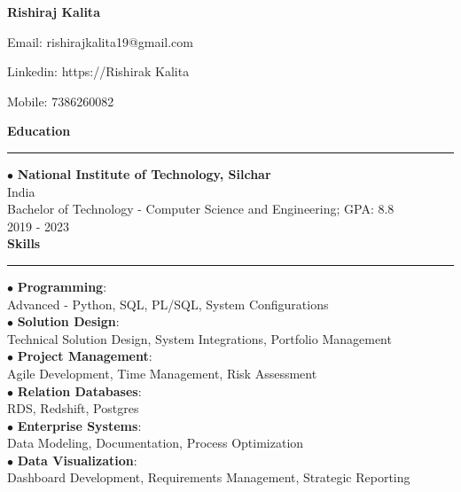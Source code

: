 \documentclass[11pt,a4paper]{article}
\renewcommand{\section}[1]{%
  \vspace{12pt}%
  {\large\bfseries #1}%
  \vspace{6pt}%
  \hrule%
  \vspace{6pt}%
}
\begin{document}
\begin{center}\Huge\textbf{Rishiraj Kalita}\\[0.5cm]\end{center}

\begin{center}Email: rishirajkalita19@gmail.com\end{center}
\begin{center}Linkedin: https://Rishirak Kalita\end{center}
\begin{center}Mobile: 7386260082\end{center}
\section{Education}

\noindent $\bullet$ \textbf{National Institute of Technology, Silchar}\\[0.2cm]
India\\[0.2cm]
Bachelor of Technology - Computer Science and Engineering; GPA: 8.8\\[0.2cm]
2019 - 2023\\[0.2cm]
\section{Skills}

\noindent $\bullet$ \textbf{Programming}:\\[0.2cm]
Advanced - Python, SQL, PL/SQL, System Configurations\\[0.2cm]
\noindent $\bullet$ \textbf{Solution Design}:\\[0.2cm]
Technical Solution Design, System Integrations, Portfolio Management\\[0.2cm]
\noindent $\bullet$ \textbf{Project Management}:\\[0.2cm]
Agile Development, Time Management, Risk Assessment\\[0.2cm]
\noindent $\bullet$ \textbf{Relation Databases}:\\[0.2cm]
RDS, Redshift, Postgres\\[0.2cm]
\noindent $\bullet$ \textbf{Enterprise Systems}:\\[0.2cm]
Data Modeling, Documentation, Process Optimization\\[0.2cm]
\noindent $\bullet$ \textbf{Data Visualization}:\\[0.2cm]
Dashboard Development, Requirements Management, Strategic Reporting\\[0.2cm]
\end{document}
